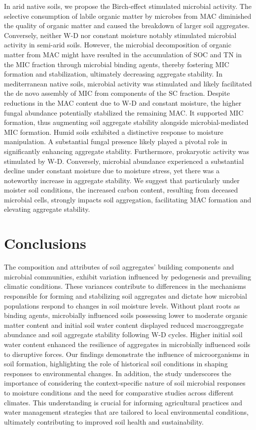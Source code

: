 In arid native soils, we propose the Birch-effect stimulated microbial activity. The selective consumption of labile organic matter by microbes from MAC diminished the quality of organic matter and caused the breakdown of larger soil aggregates. Conversely, neither W-D nor constant moisture notably stimulated microbial activity in semi-arid soils. However, the microbial decomposition of organic matter from MAC might have resulted in the accumulation of SOC and TN in the MIC fraction through microbial binding agents, thereby fostering MIC formation and stabilization, ultimately decreasing aggregate stability. In mediterranean native soils, microbial activity was stimulated and likely facilitated the de novo assembly of MIC from components of the SC fraction. Despite reductions in the MAC content due to W-D and constant moisture, the higher fungal abundance potentially stabilized the remaining MAC. It supported MIC formation, thus augmenting soil aggregate stability alongside microbial-mediated MIC formation. Humid soils exhibited a distinctive response to moisture manipulation. A substantial fungal presence likely played a pivotal role in significantly enhancing aggregate stability. Furthermore, prokaryotic activity was stimulated by W-D. Conversely, microbial abundance experienced a substantial decline under constant moisture due to moisture stress, yet there was a noteworthy increase in aggregate stability. We suggest that particularly under moister soil conditions, the increased carbon content, resulting from deceased microbial cells, strongly impacts soil aggregation, facilitating MAC formation and elevating aggregate stability.

\section{Conclusions}

The composition and attributes of soil aggregates' building components and microbial communities, exhibit variation influenced by pedogenesis and prevailing climatic conditions. These variances contribute to differences in the mechanisms responsible for forming and stabilizing soil aggregates and dictate how microbial populations respond to changes in soil moisture levels. Without plant roots as binding agents, microbially influenced soils possessing lower to moderate organic matter content and initial soil water content displayed reduced macroaggregate abundance and soil aggregate stability following W-D cycles. Higher initial soil water content enhanced the resilience of aggregates in microbially influenced soils to disruptive forces. Our findings demonstrate the influence of microorganisms in soil formation, highlighting the role of historical soil conditions in shaping responses to environmental changes. In addition, the study underscores the importance of considering the context-specific nature of soil microbial responses to moisture conditions and the need for comparative studies across different climates. This understanding is crucial for informing agricultural practices and water management strategies that are tailored to local environmental conditions, ultimately contributing to improved soil health and sustainability. 

